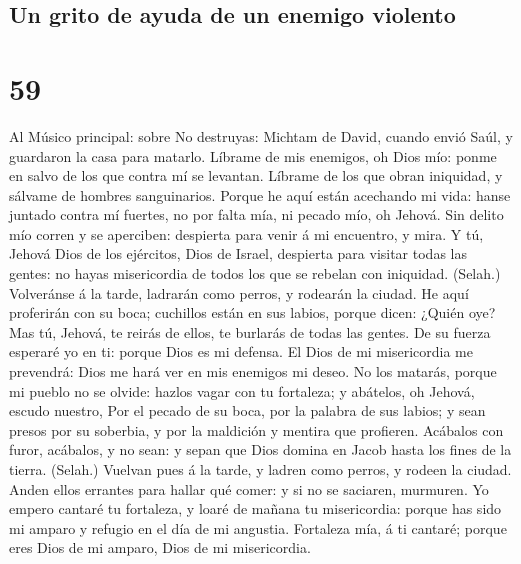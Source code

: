 \hypertarget{un-grito-de-ayuda-de-un-enemigo-violento}{%
\subsection{Un grito de ayuda de un enemigo
violento}\label{un-grito-de-ayuda-de-un-enemigo-violento}}

\hypertarget{section-58}{%
\section{59}\label{section-58}}

 Al Músico principal: sobre No destruyas: Michtam de
David, cuando envió Saúl, y guardaron la casa para matarlo. Líbrame de
mis enemigos, oh Dios mío: ponme en salvo de los que contra mí se
levantan.  Líbrame de los que obran iniquidad, y sálvame
de hombres sanguinarios.  Porque he aquí están acechando
mi vida: hanse juntado contra mí fuertes, no por falta mía, ni pecado
mío, oh Jehová.  Sin delito mío corren y se aperciben:
despierta para venir á mi encuentro, y mira.  Y tú, Jehová
Dios de los ejércitos, Dios de Israel, despierta para visitar todas las
gentes: no hayas misericordia de todos los que se rebelan con iniquidad.
(Selah.)  Volveránse á la tarde, ladrarán como perros, y
rodearán la ciudad.  He aquí proferirán con su boca;
cuchillos están en sus labios, porque dicen: ¿Quién oye? 
Mas tú, Jehová, te reirás de ellos, te burlarás de todas las gentes.
 De su fuerza esperaré yo en ti: porque Dios es mi
defensa.  El Dios de mi misericordia me prevendrá: Dios
me hará ver en mis enemigos mi deseo.  No los matarás,
porque mi pueblo no se olvide: hazlos vagar con tu fortaleza; y
abátelos, oh Jehová, escudo nuestro,  Por el pecado de su
boca, por la palabra de sus labios; y sean presos por su soberbia, y por
la maldición y mentira que profieren.  Acábalos con
furor, acábalos, y no sean: y sepan que Dios domina en Jacob hasta los
fines de la tierra. (Selah.)  Vuelvan pues á la tarde, y
ladren como perros, y rodeen la ciudad.  Anden ellos
errantes para hallar qué comer: y si no se saciaren, murmuren.
 Yo empero cantaré tu fortaleza, y loaré de mañana tu
misericordia: porque has sido mi amparo y refugio en el día de mi
angustia.  Fortaleza mía, á ti cantaré; porque eres Dios
de mi amparo, Dios de mi misericordia.

